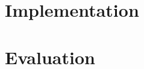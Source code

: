 \documentclass[a4paper]{article}
\begin{document}


	\section{Implementation}


	\section{Evaluation}
\end{document}
